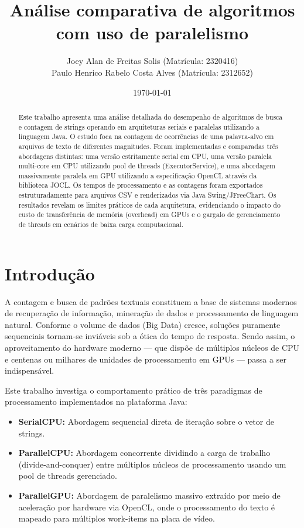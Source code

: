 \documentclass[11pt,a4paper]{article}
\title{Análise comparativa de algoritmos com uso de paralelismo}
\author{Joey Alan de Freitas Solis (Matrícula: 2320416) \\ Paulo Henrico Rabelo Costa Alves (Matrícula: 2312652)}
\date{\today}
\begin{document}
\maketitle

\begin{abstract}
Este trabalho apresenta uma análise detalhada do desempenho de algoritmos de busca e contagem de strings operando em arquiteturas seriais e paralelas utilizando a linguagem Java. O estudo foca na contagem de ocorrências de uma palavra-alvo em arquivos de texto de diferentes magnitudes. Foram implementadas e comparadas três abordagens distintas: uma versão estritamente serial em CPU, uma versão paralela multi-core em CPU utilizando pool de threads (ExecutorService), e uma abordagem massivamente paralela em GPU utilizando a especificação OpenCL através da biblioteca JOCL. Os tempos de processamento e as contagens foram exportados estruturadamente para arquivos CSV e renderizados via Java Swing/JFreeChart. Os resultados revelam os limites práticos de cada arquitetura, evidenciando o impacto do custo de transferência de memória (overhead) em GPUs e o gargalo de gerenciamento de threads em cenários de baixa carga computacional.
\end{abstract}

\section{Introdução}
A contagem e busca de padrões textuais constituem a base de sistemas modernos de recuperação de informação, mineração de dados e processamento de linguagem natural. Conforme o volume de dados (Big Data) cresce, soluções puramente sequenciais tornam-se inviáveis sob a ótica do tempo de resposta. Sendo assim, o aproveitamento do hardware moderno — que dispõe de múltiplos núcleos de CPU e centenas ou milhares de unidades de processamento em GPUs — passa a ser indispensável.

Este trabalho investiga o comportamento prático de três paradigmas de processamento implementados na plataforma Java:
\begin{itemize}
	\item \textbf{SerialCPU:} Abordagem sequencial direta de iteração sobre o vetor de strings.
	\item \textbf{ParallelCPU:} Abordagem concorrente dividindo a carga de trabalho (divide-and-conquer) entre múltiplos núcleos de processamento usando um pool de threads gerenciado.
	\item \textbf{ParallelGPU:} Abordagem de paralelismo massivo extraído por meio de aceleração por hardware via OpenCL, onde o processamento do texto é mapeado para múltiplos work-items na placa de vídeo.
\end{itemize}
\end{document}
